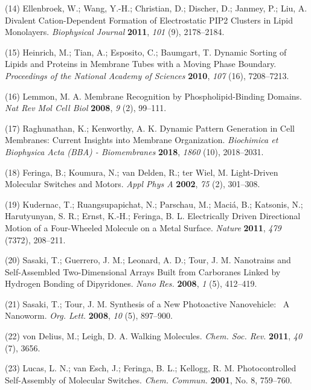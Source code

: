 \documentclass[11pt,notitlepage]{article}
\begin{document}
\leavevmode\hypertarget{ref-10CqL9t0a}{}%
(14) Ellenbroek, W.; Wang, Y.-H.; Christian, D.; Discher, D.; Janmey,
P.; Liu, A. Divalent Cation-Dependent Formation of Electrostatic PIP2
Clusters in Lipid Monolayers. \emph{Biophysical Journal} \textbf{2011},
\emph{101} (9), 2178--2184.

\leavevmode\hypertarget{ref-XIltXoGI}{}%
(15) Heinrich, M.; Tian, A.; Esposito, C.; Baumgart, T. Dynamic Sorting
of Lipids and Proteins in Membrane Tubes with a Moving Phase Boundary.
\emph{Proceedings of the National Academy of Sciences} \textbf{2010},
\emph{107} (16), 7208--7213.

\leavevmode\hypertarget{ref-uyKE7bWV}{}%
(16) Lemmon, M. A. Membrane Recognition by Phospholipid-Binding Domains.
\emph{Nat Rev Mol Cell Biol} \textbf{2008}, \emph{9} (2), 99--111.

\leavevmode\hypertarget{ref-2TfZ4zWV}{}%
(17) Raghunathan, K.; Kenworthy, A. K. Dynamic Pattern Generation in
Cell Membranes: Current Insights into Membrane Organization.
\emph{Biochimica et Biophysica Acta (BBA) - Biomembranes} \textbf{2018},
\emph{1860} (10), 2018--2031.

\leavevmode\hypertarget{ref-18PGyWtWV}{}%
(18) Feringa, B.; Koumura, N.; van Delden, R.; ter Wiel, M. Light-Driven
Molecular Switches and Motors. \emph{Appl Phys A} \textbf{2002},
\emph{75} (2), 301--308.

\leavevmode\hypertarget{ref-OAnfwOYX}{}%
(19) Kudernac, T.; Ruangsupapichat, N.; Parschau, M.; Maciá, B.;
Katsonis, N.; Harutyunyan, S. R.; Ernst, K.-H.; Feringa, B. L.
Electrically Driven Directional Motion of a Four-Wheeled Molecule on a
Metal Surface. \emph{Nature} \textbf{2011}, \emph{479} (7372), 208--211.

\leavevmode\hypertarget{ref-10MPrT2Vf}{}%
(20) Sasaki, T.; Guerrero, J. M.; Leonard, A. D.; Tour, J. M. Nanotrains
and Self-Assembled Two-Dimensional Arrays Built from Carboranes Linked
by Hydrogen Bonding of Dipyridones. \emph{Nano Res.} \textbf{2008},
\emph{1} (5), 412--419.

\leavevmode\hypertarget{ref-Tels98bO}{}%
(21) Sasaki, T.; Tour, J. M. Synthesis of a New Photoactive
Nanovehicle:~ A Nanoworm. \emph{Org. Lett.} \textbf{2008}, \emph{10}
(5), 897--900.

\leavevmode\hypertarget{ref-SfUEsk0e}{}%
(22) von Delius, M.; Leigh, D. A. Walking Molecules. \emph{Chem. Soc.
Rev.} \textbf{2011}, \emph{40} (7), 3656.

\leavevmode\hypertarget{ref-jCuccJLJ}{}%
(23) Lucas, L. N.; van Esch, J.; Feringa, B. L.; Kellogg, R. M.
Photocontrolled Self-Assembly of Molecular Switches. \emph{Chem.
Commun.} \textbf{2001}, No. 8, 759--760.
\end{document}
